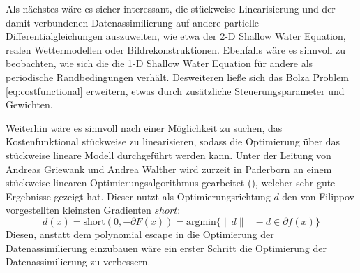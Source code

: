 Als nächstes wäre es sicher interessant, die stückweise Linearisierung und der damit verbundenen Datenassimilierung auf andere partielle Differentialgleichungen auszuweiten, wie etwa der 2-D Shallow Water Equation, realen Wettermodellen oder Bildrekonstruktionen. 
Ebenfalls wäre es sinnvoll zu beobachten, wie sich die die 1-D Shallow Water Equation für andere als periodische Randbedingungen verhält.
Desweiteren ließe sich das Bolza Problem \eqref{eq:costfunctional} erweitern, etwas durch zusätzliche Steuerungsparameter und Gewichten. 

Weiterhin wäre es sinnvoll nach einer Möglichkeit zu suchen, das Kostenfunktional stückweise zu linearisieren, sodass die Optimierung über das stückweise lineare Modell durchgeführt werden kann.
Unter der Leitung von Andreas Griewank und Andrea Walther wird zurzeit in Paderborn an einem stückweise linearen Optimierungsalgorithmus gearbeitet (\cite{griewank2014lipschitz}), welcher sehr gute Ergebnisse gezeigt hat. 
Dieser nutzt als Optimierungsrichtung $d$ den von Filippov vorgestellten kleinsten Gradienten $short$:
\[
d(x) = \text{short}(0,-\partial F(x)) = \text{argmin} \lbrace \|d\| ~|~ -d \in \partial f(x) \rbrace
\]
Diesen, anstatt dem polynomial escape in die Optimierung der Datenassimilierung einzubauen wäre ein erster Schritt die Optimierung der Datenassimilierung zu verbessern.
